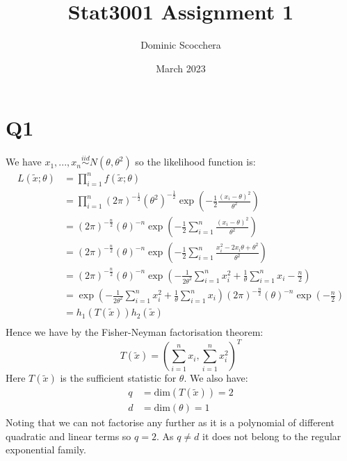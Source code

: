 \documentclass{article}
\title{Stat3001 Assignment 1}
\author{Dominic Scocchera}
\date{March 2023}
\begin{document}
\maketitle
\section*{Q1}
We have $x_1,...,x_n\stackrel{iid}{\sim}N(\theta,\theta^2)$ so the likelihood function is:
\begin{align*}
L(\tilde{x};\theta)&=\prod_{i=1}^{n}f(\tilde{x};\theta)\\
&=\prod_{i=1}^{n}(2\pi)^{-\frac{1}{2}}(\theta^2)^{-\frac{1}{2}}\exp\left(-\frac{1}{2}\frac{(x_i-\theta)^2}{\theta^2}\right)\\
&=(2\pi)^{-\frac{n}{2}}(\theta)^{-n}\exp\left(-\frac{1}{2}\sum_{i=1}^{n}\frac{(x_i-\theta)^2}{\theta^2}\right)\\
&=(2\pi)^{-\frac{n}{2}}(\theta)^{-n}\exp\left(-\frac{1}{2}\sum_{i=1}^{n}\frac{x_i^2-2x_i\theta+\theta^2}{\theta^2}\right)\\
&=(2\pi)^{-\frac{n}{2}}(\theta)^{-n}\exp\left(-\frac{1}{2\theta^2}\sum_{i=1}^{n}x_i^2+\frac{1}{\theta}\sum_{i=1}^{n}x_i-\frac{n}{2}\right)\\
&=\exp\left(-\frac{1}{2\theta^2}\sum_{i=1}^{n}x_i^2+\frac{1}{\theta}\sum_{i=1}^{n}x_i\right)(2\pi)^{-\frac{n}{2}}(\theta)^{-n}\exp\left(-\frac{n}{2}\right)\\
&=h_1(T(\tilde{x}))h_2(\tilde{x})\\
\end{align*}
\noindent Hence we have by the Fisher-Neyman factorisation theorem:
$$T(\tilde{x})=\left(\sum_{i=1}^{n}x_i,\sum_{i=1}^{n}x_i^2\right)^T$$
Here $T(\tilde{x})$ is the sufficient statistic for $\theta$. 
\newline\newline
We also have:
\begin{align*}
q&=\text{dim}(T(\tilde{x}))=2\\
d&=\text{dim}(\theta)=1
\end{align*}
Noting that we can not factorise any further as it is a polynomial of different quadratic and linear terms so $q=2$. As $q\neq d$ it does not belong to the regular exponential family.
\end{document}
